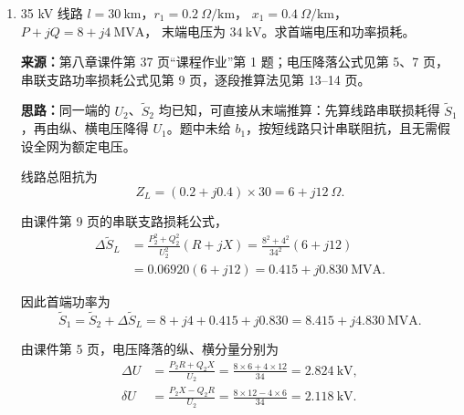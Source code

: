 \begin{enumerate}

    \item 35 kV 线路 \(l=30\ \mathrm{km}\)，\(r_1=0.2\ \Omega/\mathrm{km}\)，
          \(x_1=0.4\ \Omega/\mathrm{km}\)，\(P+jQ=8+j4\ \mathrm{MVA}\)，
          末端电压为 \(34\ \mathrm{kV}\)。求首端电压和功率损耗。

          \begin{solution}
              \begin{coursebox}
                  \textbf{来源：}第八章课件第 37 页“课程作业”第 1 题；电压降落公式见第 5、7 页，串联支路功率损耗公式见第 9 页，逐段推算法见第 13--14 页。

                  \smallskip
                  \textbf{思路：}同一端的 \(U_2\)、\(\tilde S_2\) 均已知，可直接从末端推算：先算线路串联损耗得 \(\tilde S_1\)，再由纵、横电压降得 \(U_1\)。题中未给 \(b_1\)，按短线路只计串联阻抗，且无需假设全网为额定电压。
              \end{coursebox}


              线路总阻抗为
              \begin{equation*}
                  Z_L=(0.2+j0.4)\times30=6+j12\ \Omega.
              \end{equation*}

              由课件第 9 页的串联支路损耗公式，
              \begin{align*}
                  \Delta \tilde S_L
                   & =\frac{P_2^2+Q_2^2}{U_2^2}(R+jX)
                  =\frac{8^2+4^2}{34^2}(6+j12)                         \\
                   & =0.06920(6+j12)
                  =\boxed{0.415+j0.830\ \mathrm{MVA}}.
              \end{align*}

              因此首端功率为
              \begin{equation*}
                  \tilde S_1=\tilde S_2+\Delta \tilde S_L
                  =8+j4+0.415+j0.830
                  =\boxed{8.415+j4.830\ \mathrm{MVA}}.
              \end{equation*}


              由课件第 5 页，电压降落的纵、横分量分别为
              \begin{align*}
                  \Delta U & =\frac{P_2R+Q_2X}{U_2}
                  =\frac{8\times6+4\times12}{34}
                  =2.824\ \mathrm{kV},                                  \\
                  \delta U & =\frac{P_2X-Q_2R}{U_2}
                  =\frac{8\times12-4\times6}{34}
                  =2.118\ \mathrm{kV}.
              \end{align*}


\end{solution}
\end{enumerate}
